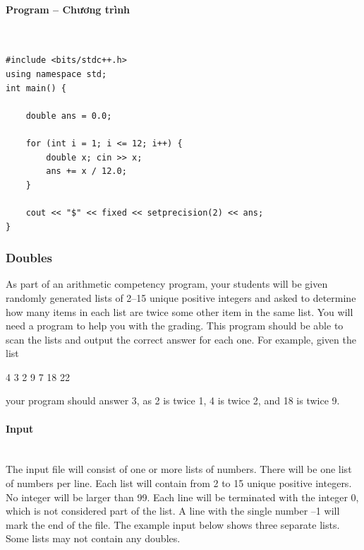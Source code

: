 \documentclass{article}
\begin{document}
\paragraph{Program -- Chương trình} \mbox{} \\


\begin{lstlisting}
#include <bits/stdc++.h>
using namespace std;
int main() {

	double ans = 0.0;

	for (int i = 1; i <= 12; i++) {
		double x; cin >> x;
		ans += x / 12.0; 
	}

	cout << "$" << fixed << setprecision(2) << ans;
}
\end{lstlisting}




\subsubsection{Doubles}

As part of an arithmetic competency program, your students will be given randomly generated lists of 2–15 unique positive integers and asked to determine how many items in each list are twice some other item in the same list. You will need a program to help you with the grading. This program should be able to scan the lists and output the correct answer for each one. For example, given the list

{ 4 3 2 9 7 18 22 \par}

your program should answer 3, as 2 is twice 1, 4 is twice 2, and 18 is twice 9.

\paragraph{Input} \mbox{} \\

The input file will consist of one or more lists of numbers. There will be one list of numbers per
line. Each list will contain from 2 to 15 unique positive integers. No integer will be larger than 99.
Each line will be terminated with the integer 0, which is not considered part of the list. A line with
the single number –1 will mark the end of the file. The example input below shows three separate
lists. Some lists may not contain any doubles.
\end{document}
